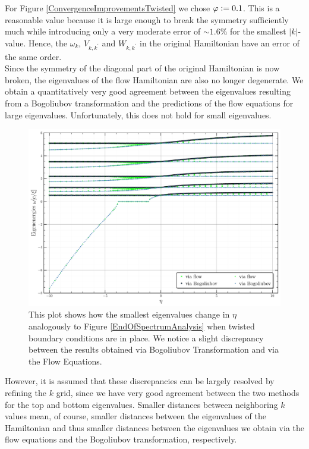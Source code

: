 For Figure \ref{ConvergenceImprovementsTwisted} we chose $\varphi\vcentcolon= 0.1$. This is a reasonable value because it is large enough to break the symmetry sufficiently much while introducing only a very moderate error of $\sim 1.6\%$ for the smallest $|k|$-value. Hence, the $\omega_k$, $V_{k,k^\prime}$ and $W_{k,k^\prime}$ in the original Hamiltonian have an error of the same order.\\
Since the symmetry of the diagonal part of the original Hamiltonian is now broken, the eigenvalues of the flow Hamiltonian are also no longer degenerate. We obtain a quantitatively very good agreement between the eigenvalues resulting from a Bogoliubov transformation and the predictions of the flow equations for large eigenvalues. Unfortunately, this does not hold for small eigenvalues.
\begin{figure}[H]
    \centering
    \includegraphics[width=\textwidth]{figures/plots/PDF/Spectral_analysis,N=40_beginning_of_spectrum.pdf}
    \caption[End of the spectrum of the Hamiltonian with twisted boundary conditions]{This plot shows how the smallest eigenvalues change in $\eta$ analogously to Figure \ref{EndOfSpectrumAnalysis} when twisted boundary conditions are in place. We notice a slight discrepancy between the results obtained via Bogoliubov Transformation and via the Flow Equations.}
    \label{ConvergenceTwistedSmallEigenvalues}
\end{figure}
However, it is assumed that these discrepancies can be largely resolved by refining the $k$ grid, since we have very good agreement between the two methods for the top and bottom eigenvalues. Smaller distances between neighboring $k$ values mean, of course, smaller distances between the eigenvalues of the Hamiltonian and thus smaller distances between the eigenvalues we obtain via the flow equations and the Bogoliubov transformation, respectively.



